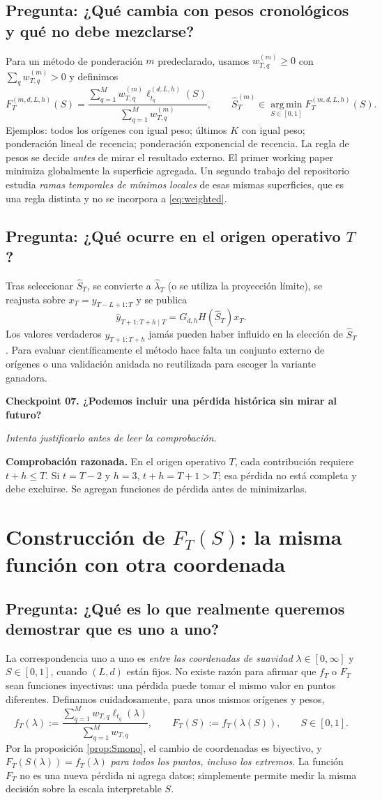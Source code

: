\documentclass[11pt,letterpaper,parskip=half,headings=small]{scrartcl}
\theoremstyle{definition}\newtheorem{definicion}[proposicion]{Definición}
\theoremstyle{remark}\newtheorem{observacion}[proposicion]{Observación}
\newcommand{\argmin}{\operatorname*{arg\,min}}\newcommand{\diag}{\operatorname{diag}}
\newcommand{\pregunta}[1]{\subsection{Pregunta: #1}}
\newcommand{\checkpoint}[3]{%
  \par\medskip\noindent\textbf{\color{blue!45!black}Checkpoint #1. #2}\par
  \noindent\emph{Intenta justificarlo antes de leer la comprobación.}\par
  \noindent\textbf{Comprobación razonada. }#3\par\bigskip
}
\begin{document}
\pregunta{¿Qué cambia con pesos cronológicos y qué no debe mezclarse?}
Para un método de ponderación $m$ predeclarado, usamos $w_{T,q}^{(m)}\geq0$ con $\sum_qw_{T,q}^{(m)}>0$ y definimos
\begin{equation}\label{eq:weighted}
\boxed{F_T^{(m,d,L,h)}(S)=
\frac{\sum_{q=1}^M w_{T,q}^{(m)}\ell_{t_q}^{(d,L,h)}(S)}
{\sum_{q=1}^M w_{T,q}^{(m)}},\qquad
\widehat S_T^{(m)}\in\argmin_{S\in[0,1]}F_T^{(m,d,L,h)}(S).}
\end{equation}
Ejemplos: todos los orígenes con igual peso; últimos $K$ con igual peso; ponderación lineal de recencia; ponderación exponencial de recencia. La regla de pesos se decide \emph{antes} de mirar el resultado externo. El primer working paper minimiza globalmente la superficie agregada. Un segundo trabajo del repositorio estudia \emph{ramas temporales de mínimos locales} de esas mismas superficies, que es una regla distinta y no se incorpora a \eqref{eq:weighted}.

\pregunta{¿Qué ocurre en el origen operativo $T$?}
Tras seleccionar $\widehat S_T$, se convierte a $\widehat\lambda_T$ (o se utiliza la proyección límite), se reajusta sobre $x_T=y_{T-L+1:T}$ y se publica
\begin{equation}\label{eq:live}\boxed{\widehat y_{T+1:T+h\mid T}=G_{d,h}H(\widehat S_T)x_T.}\end{equation}
Los valores verdaderos $y_{T+1:T+h}$ jamás pueden haber influido en la elección de $\widehat S_T$. Para evaluar científicamente el método hace falta un conjunto externo de orígenes o una validación anidada no reutilizada para escoger la variante ganadora.

\checkpoint{07}{¿Podemos incluir una pérdida histórica sin mirar al futuro?}{En el origen operativo $T$, cada contribución requiere $t+h\leq T$. Si $t=T-2$ y $h=3$, $t+h=T+1>T$; esa pérdida no está completa y debe excluirse. Se agregan funciones de pérdida antes de minimizarlas.}

\section{Construcción de $F_T(S)$: la misma función con otra coordenada}
\pregunta{¿Qué es lo que realmente queremos demostrar que es uno a uno?}
La correspondencia uno a uno es \emph{entre las coordenadas de suavidad}
$\lambda\in[0,\infty]$ y $S\in[0,1]$, cuando $(L,d)$ están fijos.
No existe razón para afirmar que $f_T$ o $F_T$ sean funciones inyectivas:
una pérdida puede tomar el mismo valor en puntos diferentes.
Definamos cuidadosamente, para unos mismos orígenes y pesos,
\[
 f_T(\lambda):=\frac{\sum_{q=1}^M w_{T,q}\ell_{t_q}(\lambda)}{\sum_{q=1}^M w_{T,q}},
 \qquad F_T(S):=f_T(\lambda(S)),\qquad S\in[0,1].
\]
Por la proposición \ref{prop:Smono}, el cambio de coordenadas es biyectivo,
y $F_T(S(\lambda))=f_T(\lambda)$ \emph{para todos los puntos, incluso los
extremos}. La función $F_T$ no es una nueva pérdida ni agrega datos;
simplemente permite medir la misma decisión sobre la escala interpretable $S$.
\end{document}
